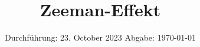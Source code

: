 

\subject{V27}
\title{Zeeman-Effekt}
\date{%
  Durchführung: 23. October 2023
  \hspace{3em}
  Abgabe: \today
}



\maketitle
\thispagestyle{empty}
\tableofcontents
\newpage








\printbibliography{}
%


